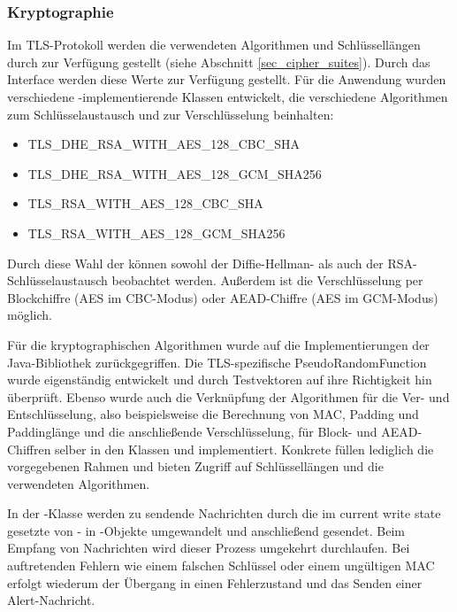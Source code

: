 \subsubsection{Kryptographie}
Im TLS-Protokoll werden die verwendeten Algorithmen und Schlüssellängen durch \ciphersuites{} zur Verfügung gestellt (siehe Abschnitt \ref{sec_cipher_suites}). Durch das Interface  werden diese Werte zur Verfügung gestellt. Für die Anwendung wurden verschiedene -implementierende Klassen entwickelt, die verschiedene Algorithmen zum Schlüsselaustausch und zur Verschlüsselung beinhalten:
\begin{itemize}
\item TLS\_DHE\_RSA\_WITH\_AES\_128\_CBC\_SHA
\item TLS\_DHE\_RSA\_WITH\_AES\_128\_GCM\_SHA256
\item TLS\_RSA\_WITH\_AES\_128\_CBC\_SHA
\item TLS\_RSA\_WITH\_AES\_128\_GCM\_SHA256
\end{itemize}
Durch diese Wahl der \ciphersuites{} können sowohl der Diffie-Hellman- als auch der RSA-Schlüsselaustausch beobachtet werden. Außerdem ist die Verschlüsselung per Blockchiffre (AES im CBC-Modus) oder AEAD-Chiffre (AES im GCM-Modus) möglich.

Für die kryptographischen Algorithmen wurde auf die Implementierungen der Java-Bibliothek zurückgegriffen. Die TLS-spezifische PseudoRandomFunction wurde eigenständig entwickelt und durch Testvektoren auf ihre Richtigkeit hin überprüft. Ebenso wurde auch die Verknüpfung der Algorithmen für die Ver- und Entschlüsselung, also beispielsweise die Berechnung von MAC, Padding und Paddinglänge und die anschließende Verschlüsselung, für Block- und AEAD-Chiffren selber in den Klassen  und  implementiert. Konkrete \ciphersuites{} füllen lediglich die vorgegebenen Rahmen und bieten Zugriff auf Schlüssellängen und die verwendeten Algorithmen.

In der -Klasse werden zu sendende Nachrichten durch die im current write state gesetzte \ciphersuite{} von - in -Objekte umgewandelt und anschließend gesendet. Beim Empfang von Nachrichten wird dieser Prozess umgekehrt durchlaufen. Bei auftretenden Fehlern wie einem falschen Schlüssel oder einem ungültigen MAC erfolgt wiederum der Übergang in einen Fehlerzustand und das Senden einer Alert-Nachricht.

